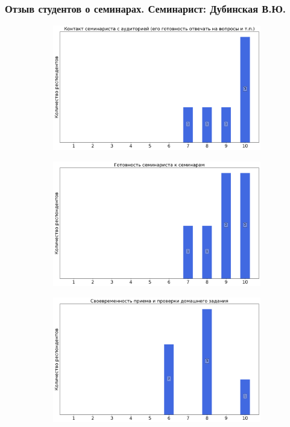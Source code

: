    \subsubsection{Отзыв студентов о семинарах. Семинарист: Дубинская В.Ю.}
		\begin{figure}[H]
			\centering
			\begin{subfigure}[b]{0.45\textwidth}
				\centering
				\includegraphics[width=\textwidth]{images/3 course/ТФКП/seminarists-marks-Дубинская В.Ю.-0.png}
			\end{subfigure}
			\begin{subfigure}[b]{0.45\textwidth}
				\centering
				\includegraphics[width=\textwidth]{images/3 course/ТФКП/seminarists-marks-Дубинская В.Ю.-1.png}
			\end{subfigure}
			\begin{subfigure}[b]{0.45\textwidth}
				\centering
				\includegraphics[width=\textwidth]{images/3 course/ТФКП/seminarists-marks-Дубинская В.Ю.-2.png}

\end{subfigure}
\end{figure}
